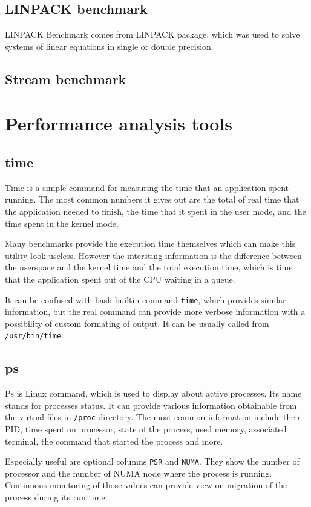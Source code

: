 \subsection{LINPACK benchmark}
LINPACK Benchmark comes from LINPACK package, which was used to solve systems of linear equations in single or double precision.

\subsection{Stream benchmark}

\section{Performance analysis tools}

\subsection{time}
Time is a simple command for measuring the time that an application spent running. The
most common numbers it gives out are the total of real time that the application needed
to finish, the time that it spent in the user mode, and the time spent in the kernel mode.

Many benchmarks provide the execution time themselves which can make this
utility look useless. However the intersting information is the difference between
the userspace and the kernel time and the total execution time, which is time that
the application spent out of the CPU waiting in a queue.

It can be confused with bash builtin command \texttt{time}, which provides similar
information, but the real command can provide more verbose information with
a possibility of custom formating of output. It can be usually called from
\texttt{/usr/bin/time}.

\subsection{ps}
Ps is Linux command, which is used to display about active processes. Its name
stands for processes status. It can provide various information obtainable from
the virtual files in \texttt{/proc} directory. The most common information
include their PID, time spent on processor, state of the process, used memory,
associated terminal, the command that started the process and more.

Especially useful are optional columns \texttt{PSR} and \texttt{NUMA}. They
show the number of processor and the number of NUMA node where the process is
running. Continuous monitoring of those values can provide view on migration of
the process during its run time. 


